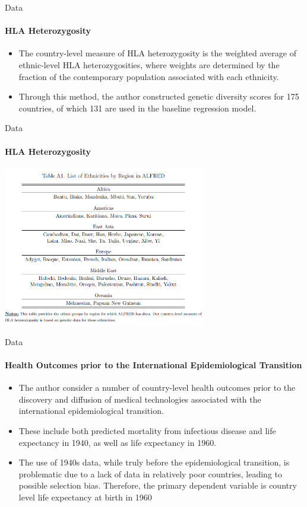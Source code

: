 \documentclass[pdftex,12pt,xcolor=pdftex,table]{beamer}
\theoremstyle{definition}
\theoremstyle{remark}
\numberwithin{equation}{section}
\numberwithin{figure}{section}
\begin{document}
\begin{frame}{Data}
\framesubtitle{HLA Heterozygosity}
\justifying

\begin{itemize}
    \item The country-level measure of HLA heterozygosity is the weighted average of ethnic-level HLA heterozygosities, where weights are determined by the fraction of the contemporary population associated with each ethnicity.
\item Through this method, the author constructed genetic diversity scores for 175 countries, of which 131 are used in the baseline regression model. 
\end{itemize}
\end{frame}

\begin{frame}{Data}
\framesubtitle{HLA Heterozygosity}
\includegraphics[height=7cm]{Appendix_1.PNG}
\centering
\end{frame}

\begin{frame}{Data}
\framesubtitle{Health Outcomes prior to the International Epidemiological Transition}
\justifying
\begin{itemize}
    \item The author consider a number of country-level health outcomes prior to the discovery and diffusion of medical technologies associated with the international epidemiological transition.
\item These include both predicted mortality from infectious disease and life expectancy in 1940, as well as life expectancy in 1960.
\item The use of 1940s data, while truly before the epidemiological transition, is problematic due to a lack of data in relatively poor countries, leading to possible selection bias. Therefore, the primary dependent variable is country level life expectancy at birth in 1960

\end{itemize}
\end{frame}
\end{document}
